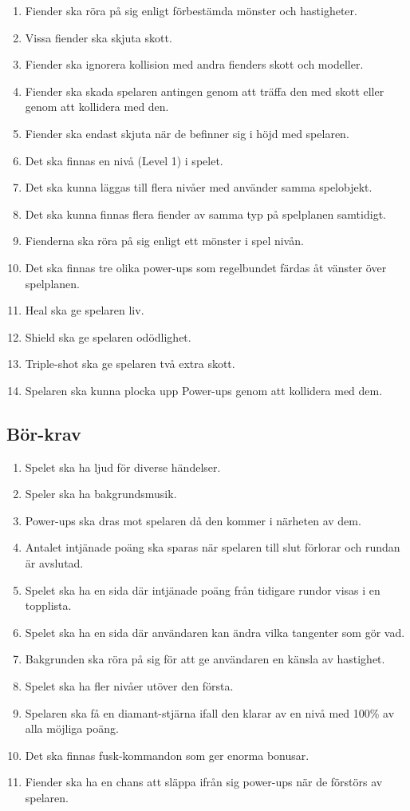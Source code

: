 \documentclass{TDP005mall}
\begin{document}
\begin{enumerate}
\item Fiender ska röra på sig enligt förbestämda mönster och hastigheter.
\item Vissa fiender ska skjuta skott.
\item Fiender ska ignorera kollision med andra fienders skott och modeller.
\item Fiender ska skada spelaren antingen genom att träffa den med skott eller genom att kollidera med den.
\item Fiender ska endast skjuta när de befinner sig i höjd med spelaren.
\item Det ska finnas en nivå (Level 1) i spelet.
\item Det ska kunna läggas till flera nivåer med använder samma spelobjekt.
\item Det ska kunna finnas flera fiender av samma typ på spelplanen samtidigt.
\item Fienderna ska röra på sig enligt ett mönster i spel nivån.
\item Det ska finnas tre olika power-ups som regelbundet färdas åt vänster över spelplanen.
\item Heal ska ge spelaren liv.
\item Shield ska ge spelaren odödlighet.
\item Triple-shot ska ge spelaren två extra skott. 
\item Spelaren ska kunna plocka upp Power-ups genom att kollidera med dem.
\end{enumerate}

\subsection{Bör-krav}
\begin{enumerate}
\item Spelet ska ha ljud för diverse händelser.
\item Speler ska ha bakgrundsmusik.
\item Power-ups ska dras mot spelaren då den kommer i närheten av dem.
\item Antalet intjänade poäng ska sparas när spelaren till slut förlorar och rundan är avslutad.
\item Spelet ska ha en sida där intjänade poäng från tidigare rundor visas i en topplista.
\item Spelet ska ha en sida där användaren kan ändra vilka tangenter som gör vad.
\item Bakgrunden ska röra på sig för att ge användaren en känsla av hastighet.
\item Spelet ska ha fler nivåer utöver den första.
\item Spelaren ska få en diamant-stjärna ifall den klarar av en nivå med 100\% av alla möjliga poäng.
\item Det ska finnas fusk-kommandon som ger enorma bonusar.
\item Fiender ska ha en chans att släppa ifrån sig power-ups när de förstörs av spelaren.

\end{enumerate}
\end{document}
